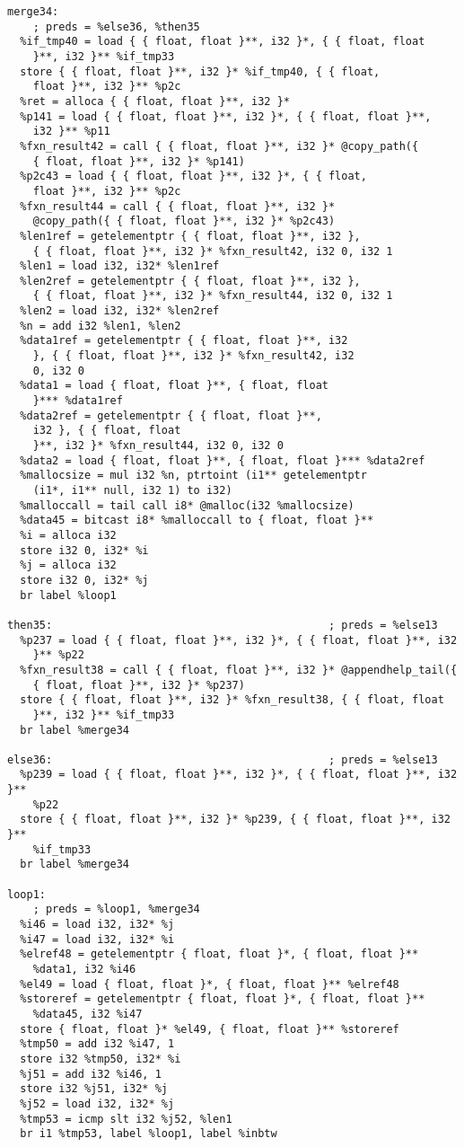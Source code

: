 \documentclass[main.tex]{subfiles}
\begin{document}
{\begin{lstlisting}
merge34:                                          
    ; preds = %else36, %then35
  %if_tmp40 = load { { float, float }**, i32 }*, { { float, float
    }**, i32 }** %if_tmp33
  store { { float, float }**, i32 }* %if_tmp40, { { float, 
    float }**, i32 }** %p2c
  %ret = alloca { { float, float }**, i32 }*
  %p141 = load { { float, float }**, i32 }*, { { float, float }**,
    i32 }** %p11
  %fxn_result42 = call { { float, float }**, i32 }* @copy_path({
    { float, float }**, i32 }* %p141)
  %p2c43 = load { { float, float }**, i32 }*, { { float, 
    float }**, i32 }** %p2c
  %fxn_result44 = call { { float, float }**, i32 }* 
    @copy_path({ { float, float }**, i32 }* %p2c43)
  %len1ref = getelementptr { { float, float }**, i32 },
    { { float, float }**, i32 }* %fxn_result42, i32 0, i32 1
  %len1 = load i32, i32* %len1ref
  %len2ref = getelementptr { { float, float }**, i32 },
    { { float, float }**, i32 }* %fxn_result44, i32 0, i32 1
  %len2 = load i32, i32* %len2ref
  %n = add i32 %len1, %len2
  %data1ref = getelementptr { { float, float }**, i32
    }, { { float, float }**, i32 }* %fxn_result42, i32
    0, i32 0
  %data1 = load { float, float }**, { float, float
    }*** %data1ref
  %data2ref = getelementptr { { float, float }**,
    i32 }, { { float, float 
    }**, i32 }* %fxn_result44, i32 0, i32 0
  %data2 = load { float, float }**, { float, float }*** %data2ref
  %mallocsize = mul i32 %n, ptrtoint (i1** getelementptr
    (i1*, i1** null, i32 1) to i32)
  %malloccall = tail call i8* @malloc(i32 %mallocsize)
  %data45 = bitcast i8* %malloccall to { float, float }**
  %i = alloca i32
  store i32 0, i32* %i
  %j = alloca i32
  store i32 0, i32* %j
  br label %loop1

then35:                                           ; preds = %else13
  %p237 = load { { float, float }**, i32 }*, { { float, float }**, i32 
    }** %p22
  %fxn_result38 = call { { float, float }**, i32 }* @appendhelp_tail({
    { float, float }**, i32 }* %p237)
  store { { float, float }**, i32 }* %fxn_result38, { { float, float 
    }**, i32 }** %if_tmp33
  br label %merge34

else36:                                           ; preds = %else13
  %p239 = load { { float, float }**, i32 }*, { { float, float }**, i32 }**
    %p22
  store { { float, float }**, i32 }* %p239, { { float, float }**, i32 }**
    %if_tmp33
  br label %merge34

loop1:                                           
    ; preds = %loop1, %merge34
  %i46 = load i32, i32* %j
  %i47 = load i32, i32* %i
  %elref48 = getelementptr { float, float }*, { float, float }**
    %data1, i32 %i46
  %el49 = load { float, float }*, { float, float }** %elref48
  %storeref = getelementptr { float, float }*, { float, float }**
    %data45, i32 %i47
  store { float, float }* %el49, { float, float }** %storeref
  %tmp50 = add i32 %i47, 1
  store i32 %tmp50, i32* %i
  %j51 = add i32 %i46, 1
  store i32 %j51, i32* %j
  %j52 = load i32, i32* %j
  %tmp53 = icmp slt i32 %j52, %len1
  br i1 %tmp53, label %loop1, label %inbtw


\end{lstlisting}}
\end{document}
